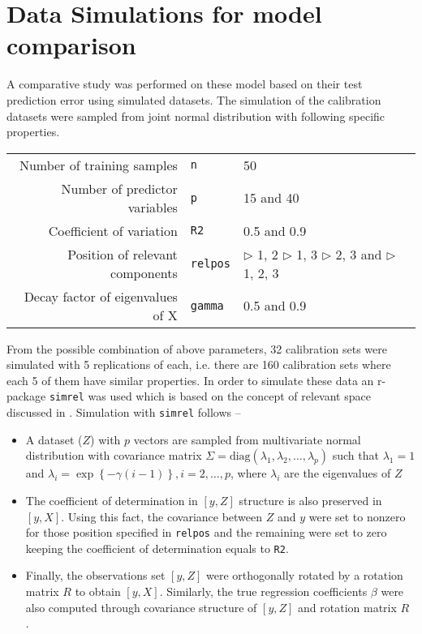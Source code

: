 \documentclass[a4paper, 11pt]{article}
\begin{document}
\section{Data Simulations for model comparison}
\label{sec:data-simulation}

A comparative study was performed on these model based on their test prediction error using simulated datasets. The simulation of the calibration datasets were sampled from joint normal distribution with following specific properties.

\bigskip

\begin{tabular}{rll}
  Number of training samples       & {\tt n}     & 50 \\
  Number of predictor variables    & {\tt p}     & 15 and 40 \\
  Coefficient of variation         & {\tt R2}    & 0.5 and 0.9 \\
  Position of relevant components  & {\tt relpos}
                                                 & $\triangleright$ 1, 2 \;           
                                                   $\triangleright$ 1,  3 \; \newline  
                                                   $\triangleright$ 2,  3 and \;       
                                                   $\triangleright$ 1,  2, 3 \\        
  Decay factor of eigenvalues of X & {\tt gamma} & 0.5 and 0.9
\end{tabular}
 
\bigskip

From the possible combination of above parameters, 32 calibration sets were simulated with 5 replications of each, i.e. there are 160 calibration sets where each 5 of them have similar properties. In order to simulate these data an r-package {\tt simrel} \citep{saebo2015simrel} was used which is based on the concept of relevant space discussed in \citet{helland1994comparison}. Simulation with {\tt simrel} follows --

\begin{itemize}[label=$\triangleright$]
\item A dataset ($Z$) with $p$ vectors are sampled from multivariate normal distribution with covariance matrix $\Sigma = \text{diag}(\lambda_1, \lambda_2, \ldots, \lambda_p)$ such that $\lambda_1 = 1$ and $\lambda_i = \exp\left\{{-\gamma(i - 1)}\right\}, i = 2, \ldots, p$, where $\lambda_i$ are the eigenvalues of $Z$
\item The coefficient of determination in $\left[ y, Z \right]$ structure is also preserved in $\left[ y, X \right]$. Using this fact, the covariance between $Z$ and $y$ were set to nonzero for those position specified in {\tt relpos} and the remaining were set to zero keeping the coefficient of determination equals to {\tt R2}.
\item Finally, the observations set $\left[ y, Z \right]$ were orthogonally rotated by a rotation matrix $R$ to obtain $\left[ y, X \right]$. Similarly, the true regression coefficients $\beta$ were also computed through covariance structure of $\left[ y, Z \right]$ and rotation matrix $R$ \citep[see: ][]{saebo2015simrel}.
\end{itemize}
\end{document}
